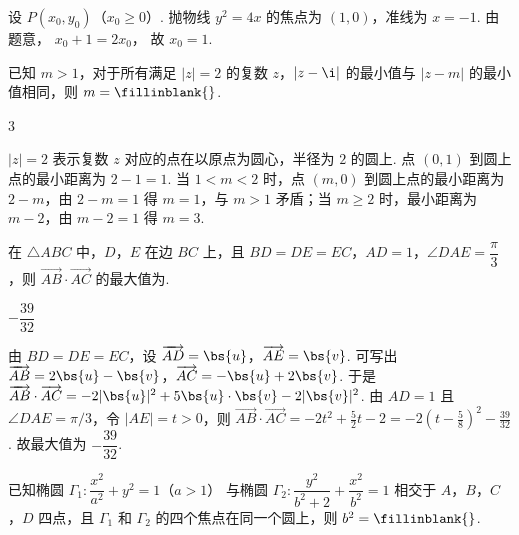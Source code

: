 \begin{solution}
设 \(P(x_0,y_0)\)（\(x_0\ge0\)）. 抛物线 \(y^2=4x\) 的焦点为 \((1,0)\)，准线为 \(x=-1\). 由题意，
\(x_0+1=2x_0\)，
故 \(x_0=1\).
\end{solution}

\begin{problem}
已知 \(m>1\)，对于所有满足 \(|z|=2\) 的复数 \(z\)，\(|z-\i|\) 的最小值与 \(|z-m|\) 的最小值相同，则 \(m=\fillinblank{}\).
\end{problem}

\begin{answer}
\(3\)
\end{answer}

\begin{solution}
\(|z|=2\) 表示复数 \(z\) 对应的点在以原点为圆心，半径为 \(2\) 的圆上. 点 \((0,1)\) 到圆上点的最小距离为 \(2-1=1\). 当 \(1<m<2\) 时，点 \((m,0)\) 到圆上点的最小距离为 \(2-m\)，由 \(2-m=1\) 得 \(m=1\)，与 \(m>1\) 矛盾；当 \(m\ge2\) 时，最小距离为 \(m-2\)，由 \(m-2=1\) 得 \(m=3\).
\end{solution}

\begin{problem}
在 \(\triangle ABC\) 中，\(D\)，\(E\) 在边 \(BC\) 上，且 \(BD=DE=EC\)，\(AD=1\)，\(\angle DAE=\dfrac{\pi}{3}\)，则 \(\overrightarrow{AB}\cdot\overrightarrow{AC}\) 的最大值为\fillinblank{}.

\end{problem}

\begin{answer}
\(-\dfrac{39}{32}\)
\end{answer}

\begin{solution}
由 \(BD=DE=EC\)，设 \(\overrightarrow{AD}=\bs{u}\)，\(\overrightarrow{AE}=\bs{v}\). 可写出
\(\overrightarrow{AB}=2\bs{u}-\bs{v}\)，\(\overrightarrow{AC}=-\bs{u}+2\bs{v}\).
于是
\(\overrightarrow{AB}\cdot\overrightarrow{AC}=-2|\bs{u}|^2+5\bs{u}\cdot\bs{v}-2|\bs{v}|^2\).
由 \(AD=1\) 且 \(\angle DAE=\pi/3\)，令 \(|AE|=t>0\)，则
\(\overrightarrow{AB}\cdot\overrightarrow{AC}=-2t^2+\frac52t-2=-2\left(t-\frac58\right)^2-\frac{39}{32}\).
故最大值为 \(-\dfrac{39}{32}\).
\end{solution}

\begin{problem}
已知椭圆 \(\Gamma_1:\dfrac{x^2}{a^2}+y^2=1\)（\(a>1\)） 与椭圆 \(\Gamma_2:\dfrac{y^2}{b^2+2}+\dfrac{x^2}{b^2}=1\) 相交于 \(A\)，\(B\)，\(C\)，\(D\) 四点，且 \(\Gamma_1\) 和 \(\Gamma_2\) 的四个焦点在同一个圆上，则 \(b^2=\fillinblank{}\).
\end{problem}

